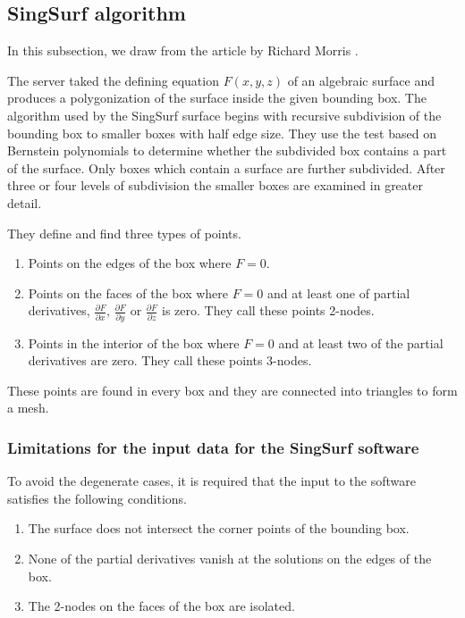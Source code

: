 \subsection{SingSurf algorithm}
In this subsection, we draw from the article by Richard Morris \cite{morris2003client}.

The server taked the defining equation $F(x, y, z)$ of an algebraic surface and 
produces a polygonization of the surface inside the given bounding box.
The algorithm used by the SingSurf surface begins with recursive subdivision of
the bounding box to smaller boxes with half edge size. They use the test based 
on Bernstein polynomials to determine whether the subdivided box contains a part of
the surface. Only boxes which contain a surface are further subdivided.
After three or four levels of subdivision the smaller boxes are examined in greater detail.

They define and find three types of points.
\begin{enumerate}
    \item{Points on the edges of the box where $F=0$.}
    \item{Points on the faces of the box where $F=0$ and at least one of partial
    derivatives, $\frac{\partial F}{\partial x}$, $\frac{\partial F}{\partial y}$
    or $\frac{\partial F}{\partial z}$ is zero. They call these points 2-nodes.}
    \item{Points in the interior of the box where $F=0$ and at least two of the
    partial derivatives are zero. They call these points 3-nodes.}
\end{enumerate}

These points are found in every box and they are connected into triangles to form 
a mesh.

\subsubsection*{Limitations for the input data for the SingSurf software}
To avoid the degenerate cases, it is required that the input to the
software satisfies the following conditions.
\begin{enumerate}
    \item {The surface does not intersect the corner points of the bounding box.}
    \item {None of the partial derivatives vanish at the solutions on the edges of the box.}
    \item {The 2-nodes on the faces of the box are isolated.}
\end{enumerate}

